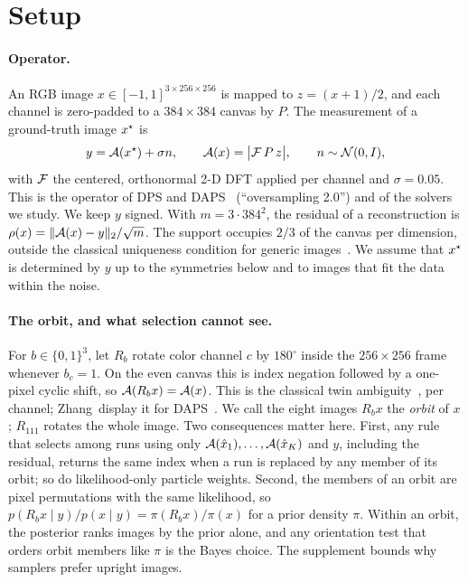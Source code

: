 \section{Setup}
\label{sec:setup}

\paragraph{Operator.}
An RGB image $x\in[-1,1]^{3\times256\times256}$ is mapped to $z=(x+1)/2$, and each channel is zero-padded to a $384\times384$ canvas by $P$.
The measurement of a ground-truth image $x^\star$ is
\begin{equation}
y=\mathcal{A}(x^\star)+\sigma n,\qquad \mathcal{A}(x)=\bigl|\mathcal{F}\,P\,z\bigr|,\qquad n\sim\mathcal N(0,I),
\label{eq:operator}
\end{equation}
with $\mathcal{F}$ the centered, orthonormal 2-D DFT applied per channel and $\sigma=0.05$.
This is the operator of DPS and DAPS~\cite{chung2023dps,zhang2025daps} (``oversampling 2.0'') and of the solvers we study.
We keep $y$ signed.
With $m=3\cdot384^2$, the residual of a reconstruction is $\rho(x)=\|\mathcal{A}(x)-y\|_2/\sqrt m$.
The support occupies $2/3$ of the canvas per dimension, outside the classical uniqueness condition for generic images~\cite{bruck1979ambiguity,barnett2020geometry}.
We assume that $x^\star$ is determined by $y$ up to the symmetries below and to images that fit the data within the noise.

\paragraph{The orbit, and what selection cannot see.}
For $b\in\{0,1\}^3$, let $R_b$ rotate color channel $c$ by $180^\circ$ inside the $256\times256$ frame whenever $b_c=1$.
On the even canvas this is index negation followed by a one-pixel cyclic shift, so $\mathcal{A}(R_bx)=\mathcal{A}(x)$.
This is the classical twin ambiguity~\cite{hayes1982reconstruction,fienup1986stagnation}, per channel; Zhang~\etal display it for DAPS~\cite[App.~F]{zhang2025daps}.
We call the eight images $R_bx$ the \emph{orbit} of $x$; $R_{111}$ rotates the whole image.
Two consequences matter here.
First, any rule that selects among runs using only $\mathcal{A}(\hat x_1),\dots,\mathcal{A}(\hat x_K)$ and $y$, including the residual, returns the same index when a run is replaced by any member of its orbit; so do likelihood-only particle weights.
Second, the members of an orbit are pixel permutations with the same likelihood, so $p(R_bx\mid y)/p(x\mid y)=\pi(R_bx)/\pi(x)$ for a prior density $\pi$.
Within an orbit, the posterior ranks images by the prior alone, and any orientation test that orders orbit members like $\pi$ is the Bayes choice.
The supplement bounds why samplers prefer upright images.

